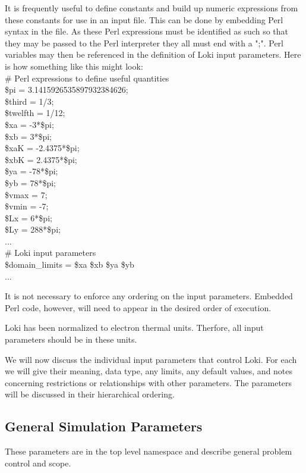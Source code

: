 \documentclass[11pt]{amsart}
\begin{document}
It is frequently useful to define constants and build up numeric expressions
from these constants for use in an input file.  This can be done by embedding
Perl syntax in the file.  As these Perl expressions must be identified as such
so that they may be passed to the Perl interpreter they all must end with a
";".  Perl variables may then be referenced in the definition of Loki input
parameters.  Here is how something like this might look: \\
\# Perl expressions to define useful quantities \\
\$pi = 3.1415926535897932384626; \\
\$third = 1/3; \\
\$twelfth = 1/12; \\
\$xa = -3*\$pi; \\
\$xb =  3*\$pi; \\
\$xaK = -2.4375*\$pi; \\
\$xbK = 2.4375*\$pi; \\
\$ya = -78*\$pi; \\
\$yb =  78*\$pi; \\
\$vmax =  7; \\
\$vmin = -7; \\
\$Lx = 6*\$pi; \\
\$Ly = 288*\$pi; \\
...\\
\# Loki input parameters \\
\$domain\_limits = \$xa \$xb \$ya \$yb \\
...

It is not necessary to enforce any ordering on the input parameters.  Embedded
Perl code, however, will need to appear in the desired order of execution.

Loki has been normalized to electron thermal units.  Therfore, all input
parameters should be in these units.

We will now discuss the individual input parameters that control Loki.  For
each we will give their meaning, data type, any limits, any default values, and
notes concerning restrictions or relationships with other parameters.  The
parameters will be discussed in their hierarchical ordering.

\subsection*{General Simulation Parameters}
These parameters are in the top level namespace and describe general problem
control and scope.
\end{document}
